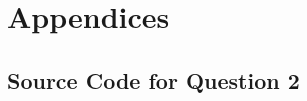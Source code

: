 \newpage

\section*{Appendices}

\subsection*{Source Code for Question 2}

\lstset{language=r,tabsize=4}

